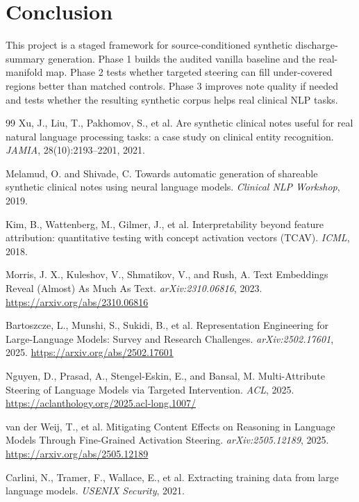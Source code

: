 \documentclass[11pt]{article}
\begin{document}
\section{Conclusion}

This project is a staged framework for source-conditioned synthetic discharge-summary generation. Phase 1 builds the audited vanilla baseline and the real-manifold map. Phase 2 tests whether targeted steering can fill under-covered regions better than matched controls. Phase 3 improves note quality if needed and tests whether the resulting synthetic corpus helps real clinical NLP tasks.

\begin{thebibliography}{99}
Xu, J., Liu, T., Pakhomov, S., et al.
\newblock Are synthetic clinical notes useful for real natural language processing tasks: a case study on clinical entity recognition.
\newblock \emph{JAMIA}, 28(10):2193--2201, 2021.

Melamud, O. and Shivade, C.
\newblock Towards automatic generation of shareable synthetic clinical notes using neural language models.
\newblock \emph{Clinical NLP Workshop}, 2019.

Kim, B., Wattenberg, M., Gilmer, J., et al.
\newblock Interpretability beyond feature attribution: quantitative testing with concept activation vectors (TCAV).
\newblock \emph{ICML}, 2018.

Morris, J. X., Kuleshov, V., Shmatikov, V., and Rush, A.
\newblock Text Embeddings Reveal (Almost) As Much As Text.
\newblock \emph{arXiv:2310.06816}, 2023.
\newblock \url{https://arxiv.org/abs/2310.06816}

Bartoszcze, L., Munshi, S., Sukidi, B., et al.
\newblock Representation Engineering for Large-Language Models: Survey and Research Challenges.
\newblock \emph{arXiv:2502.17601}, 2025.
\newblock \url{https://arxiv.org/abs/2502.17601}

Nguyen, D., Prasad, A., Stengel-Eskin, E., and Bansal, M.
\newblock Multi-Attribute Steering of Language Models via Targeted Intervention.
\newblock \emph{ACL}, 2025.
\newblock \url{https://aclanthology.org/2025.acl-long.1007/}

van der Weij, T., et al.
\newblock Mitigating Content Effects on Reasoning in Language Models Through Fine-Grained Activation Steering.
\newblock \emph{arXiv:2505.12189}, 2025.
\newblock \url{https://arxiv.org/abs/2505.12189}

Carlini, N., Tramer, F., Wallace, E., et al.
\newblock Extracting training data from large language models.
\newblock \emph{USENIX Security}, 2021.
\end{thebibliography}
\end{document}
